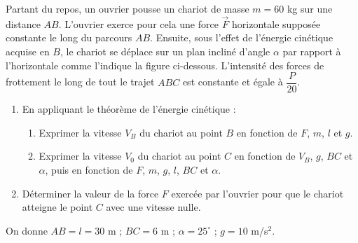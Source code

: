 \documentclass[11pt]{article}
\begin{document}


Partant du repos, un ouvrier pousse un chariot de masse $m = 60$ kg sur une distance $AB$. L'ouvrier exerce pour cela une force $\vec{F}$ horizontale supposée constante le long du parcours $AB$. Ensuite, sous l'effet de l'énergie cinétique acquise en $B$, le chariot se déplace sur un plan incliné d'angle $\alpha$ par rapport à l'horizontale comme l'indique la figure ci-dessous. L'intensité des forces de frottement le long de tout le trajet $ABC$ est constante et égale à $\dfrac{P}{20}$.

\begin{center}
\end{center}

\begin{enumerate}
  \item En appliquant le théorème de l'énergie cinétique :
  \begin{enumerate}[label=\alph*.]
    \item Exprimer la vitesse $V_B$ du chariot au point $B$ en fonction de $F$, $m$, $l$ et $g$.
    \item Exprimer la vitesse $V_0$ du chariot au point $C$ en fonction de $V_B$, $g$, $BC$ et $\alpha$, puis en fonction de $F$, $m$, $g$, $l$, $BC$ et $\alpha$.
  \end{enumerate}
  \item Déterminer la valeur de la force $F$ exercée par l'ouvrier pour que le chariot atteigne le point $C$ avec une vitesse nulle.
\end{enumerate}
\noindent On donne $AB = l = 30$ m ; $BC = 6$ m ; $\alpha = 25^\circ$ ; $g = 10$ m/s$^2$.
\end{document}
